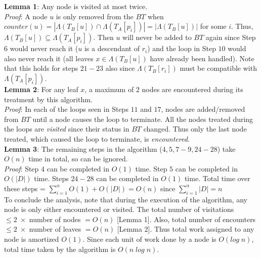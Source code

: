 \documentclass[a4paper]{article}
\begin{document}
    \textbf{Lemma 1}: Any node is visited at most twice.\\
    \textit{Proof}: A node $u$ is only removed from the $BT$ when $counter(u) = |\Lambda(T_B[u]) \cap \Lambda(T_A[p_i])| = |\Lambda(T_B[u])|$ for some $i$. Thus, $\Lambda(T_B[u]) \subseteq \Lambda(T_A[p_i])$. Then $u$ will never be added to $BT$ again since Step $6$ would never reach it ($u$ is a descendant of $r_i$) and the loop in Step $10$ would also never reach it (all leaves $x \in \Lambda(T_B[u])$ have already been handled). Note that this holds for steps $21-23$ also since $\Lambda(T_B[r_i])$ must be compatible with $\Lambda(T_A[p_i])$.\\

    \textbf{Lemma 2}: For any leaf $x$, a maximum of $2$ nodes are encountered during its treatment by this algorithm.\\
    \textit{Proof}: In each of the loops seen in Steps $11$ and $17$, nodes are added/removed from $BT$ until a node causes the loop to terminate. All the nodes treated during the loops are \textit{visited} since their status in $BT$ changed. Thus only the last node treated, which caused the loop to terminate, is \textit{encountered}.\\

    \textbf{Lemma 3}: The remaining steps in the algorithm ($4, 5, 7-9, 24-28$) take $O(n)$ time in total, so can be ignored.\\
    \textit{Proof}: Step $4$ can be completed in $O(1)$ time. Step $5$ can be completed in $O(|D|)$ time. Steps $24-28$ can be completed in $O(1)$ time. Total time over these steps = $\sum_{i=1}^{\alpha}O(1) + O(|D|) = O(n)$ since $\sum_{i=1}^{\alpha}|D| = n$\\

   To conclude the analysis, note that during the execution of the algorithm, any node is only either encountered or visited. The total number of visitations $\leq 2\;\times$ number of nodes $= O(n)$ [Lemma 1]. Also, total number of encounters $\leq 2\;\times$ number of leaves $= O(n)$ [Lemma 2]. Thus total work assigned to any node is amortized $O(1)$. Since each unit of work done by a node is $O(log\;n)$, total time taken by the algorithm is $O(n\;log\;n)$.\\
\end{document}
